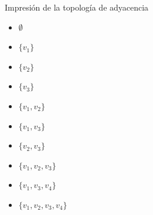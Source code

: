 \begin{frame}{Impresión de la topología de adyacencia}
   \centering
   \hspace*{0.22cm}%
   \begin{minipage}{5cm}
      \centering
      
   \end{minipage}%
   \hspace{1.2cm}%
   \begin{minipage}{3.4cm}
      \begin{itemize}
         \item $\emptyset$
         \item $\{v_1\}$
         \item $\{v_2\}$
         \item $\{v_3\}$
         \item $\{v_1,v_2\}$
         \item $\{v_1,v_3\}$
         \item $\{v_2,v_3\}$
         \item $\{v_1,v_2,v_3\}$
         \item $\{v_1,v_3,v_4\}$
         \item $\{v_1,v_2,v_3,v_4\}$
      \end{itemize}
   \end{minipage}
\end{frame}
